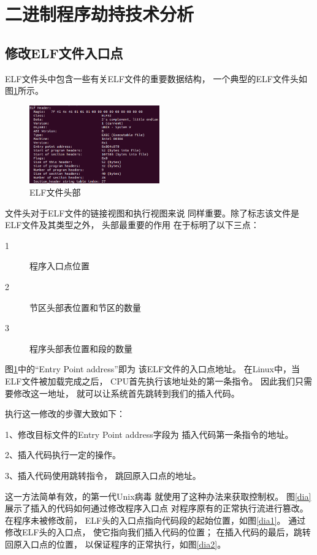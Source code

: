 
\section{二进制程序劫持技术分析}
\label{section_hijack}


\subsection{修改ELF文件入口点}

ELF文件头中包含一些有关ELF文件的重要数据结构，
一个典型的ELF文件头如图\ref{header}所示。
\begin{figure}[h!]
  \centering
  \includegraphics[width=0.5\textwidth]{figure/header.png}
  \caption{ELF文件头部}
  \label{header}
\end{figure}
文件头对于ELF文件的链接视图和执行视图来说
同样重要。除了标志该文件是ELF文件及其类型之外，
头部最重要的作用
在于标明了以下三点：

\begin{description}
  \item [1]  程序入口点位置
  \item [2]  节区头部表位置和节区的数量
  \item [3]  程序头部表位置和段的数量 
\end{description}

图\ref{header}中的“Entry Point address”即为
该ELF文件的入口点地址。
在Linux中，当ELF文件被加载完成之后，
CPU首先执行该地址处的第一条指令。
因此我们只需要修改这一地址，
就可以让系统首先跳转到我们的插入代码。

执行这一修改的步骤大致如下：

1、修改目标文件的Entry Point address字段为
插入代码第一条指令的地址。

2、插入代码执行一定的操作。

3、插入代码使用跳转指令，
跳回原入口点的地址。

这一方法简单有效，\cite{silvio}的第一代Unix病毒
就使用了这种办法来获取控制权。
图\ref{dia}展示了插入的代码如何通过修改程序入口点
对程序原有的正常执行流进行篡改。
在程序未被修改前，
ELF头的入口点指向代码段的起始位置，如图\ref{dia1}。
通过修改ELF头的入口点，
使它指向我们插入代码的位置；
在插入代码的最后，跳转回原入口点的位置，
以保证程序的正常执行，如图\ref{dia2}。

